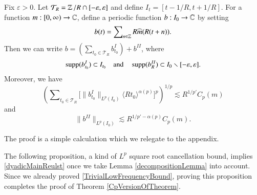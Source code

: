 \begin{lemma} \label{decompositionLemma}
    Fix $\varepsilon > 0$. Let $\mathcal{T}_R = \operatorname{\mathbb{Z}}/R \cap [-\varepsilon, \varepsilon]$ and define $I_t = [t - 1/R, t + 1/R]$. For a function $m: [0,\infty) \to \operatorname{\mathbb{C}}$, define a periodic function $b: I_0 \to \operatorname{\mathbb{C}}$ by setting
    \begin{equation}
        b(t) = \sum\nolimits_{n \in \operatorname{\mathbb{Z}}} R \widehat{m}(R(t + n)).
    \end{equation}
    Then we can write $b = \left( \sum\nolimits_{t_0 \in \mathcal{T}_R} b_{t_0}^I \right) + b^{II}$, where
    \begin{equation} \operatorname{\text{supp}}(b_{t_0}^I) \subset I_{t_0} \quad\text{and}\quad \operatorname{\text{supp}}(b_R^{II}) \subset I_0 \smallsetminus [-\varepsilon,\varepsilon].
    \end{equation}
    Moreover, we have
    \begin{equation} \label{DKAPDKAWIODJAWOI}
        \left( \sum\nolimits_{t_0 \in \mathcal{T}_R} \Big[ \| b^I_{t_0} \|_{L^p(I_0)} \langle R t_0 \rangle^{\alpha(p)} \Big]^p \right)^{1/p} \lesssim R^{1/p'} C_p(m)
    \end{equation}
        and
    \begin{equation} \label{DWAIOJDAOIWDJWAIODJIOJD}
        \| b^{II} \|_{L^p(I_0)} \lesssim R^{1/p' - \alpha(p)} C_p(m).
    \end{equation}
\end{lemma}

The proof is a simple calculation which we relegate to the appendix.

The following proposition, a kind of $L^p$ square root cancellation bound, implies \eqref{dyadicMainReulst} once we take Lemma \ref{decompositionLemma} into account. %
Since we already proved \eqref{TrivialLowFrequencyBound}, proving this proposition completes the proof of Theorem \ref{CpVersionOfTheorem}.

